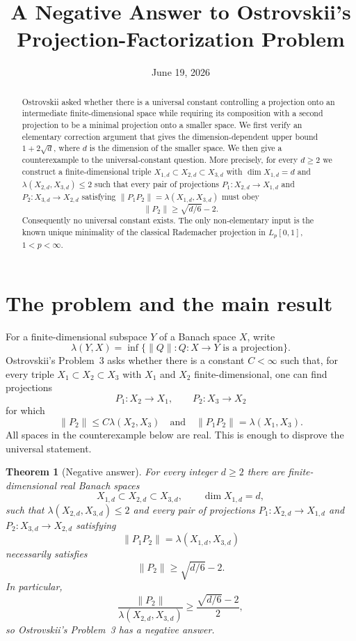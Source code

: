 \documentclass[11pt]{article}
\title{A Negative Answer to Ostrovskii's\\Projection-Factorization Problem}
\author{}
\date{June 19, 2026}
\newtheorem{theorem}{Theorem}[section]
\theoremstyle{remark}
\begin{document}
\maketitle

\begin{abstract}
Ostrovskii asked whether there is a universal constant controlling a projection
onto an intermediate finite-dimensional space while requiring its composition
with a second projection to be a minimal projection onto a smaller space.  We
first verify an elementary correction argument that gives the dimension-dependent
upper bound $1+2\sqrt d$, where $d$ is the dimension of the smaller space.  We
then give a counterexample to the universal-constant question.  More precisely,
for every $d\geq 2$ we construct a finite-dimensional triple
$X_{1,d}\subset X_{2,d}\subset X_{3,d}$ with $\dim X_{1,d}=d$ and
$\lambda(X_{2,d},X_{3,d})\leq 2$ such that every pair of projections
$P_1:X_{2,d}\to X_{1,d}$ and $P_2:X_{3,d}\to X_{2,d}$ satisfying
$\|P_1P_2\|=\lambda(X_{1,d},X_{3,d})$ must obey
\[
        \|P_2\|\geq \sqrt{d/6}-2.
\]
Consequently no universal constant exists.  The only non-elementary input is
the known unique minimality of the classical Rademacher projection in
$L_p[0,1]$, $1<p<\infty$.
\end{abstract}

\section{The problem and the main result}

For a finite-dimensional subspace $Y$ of a Banach space $X$, write
\[
 \lambda(Y,X)=\inf\{\|Q\|: Q:X\to Y\text{ is a projection}\}.
\]
Ostrovskii's Problem~3 \cite{Ostrovskii} asks whether there is a constant $C<\infty$ such that,
for every triple $X_1\subset X_2\subset X_3$ with $X_1$ and $X_2$
finite-dimensional, one can find projections
\[
 P_1:X_2\to X_1,\qquad P_2:X_3\to X_2
\]
for which
\[
 \|P_2\|\leq C\lambda(X_2,X_3)
 \quad\text{and}\quad
 \|P_1P_2\|=\lambda(X_1,X_3).
\]
All spaces in the counterexample below are real.  This is enough to disprove
the universal statement.

\begin{theorem}[Negative answer]\label{thm:main}
For every integer $d\geq 2$ there are finite-dimensional real Banach spaces
\[
 X_{1,d}\subset X_{2,d}\subset X_{3,d},
 \qquad \dim X_{1,d}=d,
\]
such that $\lambda(X_{2,d},X_{3,d})\leq 2$ and every pair of projections
$P_1:X_{2,d}\to X_{1,d}$ and $P_2:X_{3,d}\to X_{2,d}$ satisfying
\[
       \|P_1P_2\|=\lambda(X_{1,d},X_{3,d})
\]
necessarily satisfies
\[
       \|P_2\|\geq \sqrt{d/6}-2.
\]
In particular,
\[
 \frac{\|P_2\|}{\lambda(X_{2,d},X_{3,d})}
 \geq \frac{\sqrt{d/6}-2}{2},
\]
so Ostrovskii's Problem~3 has a negative answer.
\end{theorem}
\end{document}
